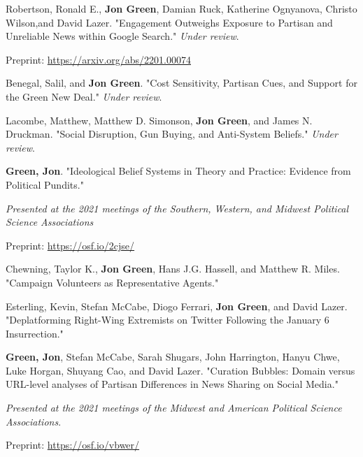 \documentclass[letterpaper]{article}
\renewenvironment{itemize}{
  \begin{list}{}{
    \setlength{\leftmargin}{1.5em}
  }
}{
  \end{list}
}
\begin{document}
\begin{itemize}
\item Robertson, Ronald E., \textbf{Jon Green}, Damian Ruck, Katherine Ognyanova, Christo Wilson,and  David Lazer.  "Engagement Outweighs Exposure to Partisan and Unreliable News within Google Search." \textit{Under review}.
\begin{itemize}
\item Preprint: \url{https://arxiv.org/abs/2201.00074}
\end{itemize} 

\item Benegal, Salil, and \textbf{Jon Green}. "Cost Sensitivity, Partisan Cues, and Support for the Green New Deal." \textit{Under review}.

\item Lacombe, Matthew, Matthew D. Simonson, \textbf{Jon Green}, and James N. Druckman. "Social Disruption, Gun Buying, and Anti-System Beliefs." \textit{Under review}.

\item \textbf{Green, Jon}. "Ideological Belief Systems in Theory and Practice: Evidence from Political Pundits." 
\begin{itemize}
\item \textit{Presented at the 2021 meetings of the Southern, Western, and Midwest Political Science Associations}
\item Preprint: \url{https://osf.io/2cjse/}
\end{itemize}

\item Chewning, Taylor K., \textbf{Jon Green}, Hans J.G. Hassell, and Matthew R. Miles. "Campaign Volunteers as Representative Agents."

\item Esterling, Kevin, Stefan McCabe, Diogo Ferrari, \textbf{Jon Green}, and David Lazer. "Deplatforming Right-Wing Extremists on Twitter Following the January 6 Insurrection."

\item \textbf{Green, Jon}, Stefan McCabe, Sarah Shugars, John Harrington, Hanyu Chwe, Luke Horgan, Shuyang Cao, and David Lazer.  "Curation Bubbles: Domain versus URL-level analyses of Partisan Differences in News Sharing on Social Media."
\begin{itemize}
\item \textit{Presented at the 2021 meetings of the Midwest and American Political Science Associations}.
\item Preprint: \url{https://osf.io/vbwer/}
\end{itemize} 


\end{itemize}
\end{document}
